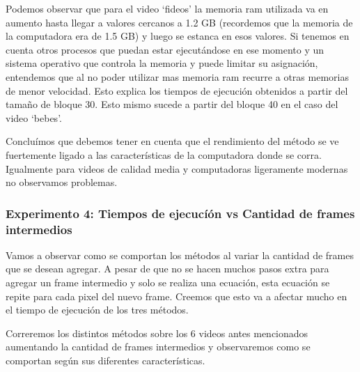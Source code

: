 \FloatBarrier
\par Podemos observar que para el video `fideos' la memoria ram utilizada va en aumento hasta llegar a valores cercanos a 1.2 GB (recordemos que la memoria de la computadora era de 1.5 GB) y luego se estanca en esos valores. Si tenemos en cuenta otros procesos que puedan estar ejecut\'andose en ese momento y un sistema operativo que controla la memoria y puede limitar su asignaci\'on, entendemos que al no poder utilizar mas memoria ram recurre a otras memorias de menor velocidad. Esto explica los tiempos de ejecuci\'on obtenidos a partir del tama\~no de bloque 30. Esto mismo sucede a partir del bloque 40 en el caso del video `bebes'.
\par Conclu\'imos que debemos tener en cuenta que el rendimiento del m\'etodo se ve fuertemente ligado a las caracter\'isticas de la computadora donde se corra. Igualmente para videos de calidad media y computadoras ligeramente modernas no observamos problemas.

\subsubsection{Experimento 4: Tiempos de ejecucí\'on vs Cantidad de frames intermedios}
\par Vamos a observar como se comportan los m\'etodos al variar la cantidad de frames que se desean agregar. A pesar de que no se hacen muchos pasos extra para agregar un frame intermedio y solo se realiza una ecuaci\'on, esta ecuaci\'on se repite para cada pixel del nuevo frame. Creemos que esto va a afectar mucho en el tiempo de ejecuci\'on de los tres m\'etodos.
\par Correremos los distintos m\'etodos sobre los 6 videos antes mencionados aumentando la cantidad de frames intermedios y observaremos como se comportan seg\'un sus diferentes caracter\'isticas.

